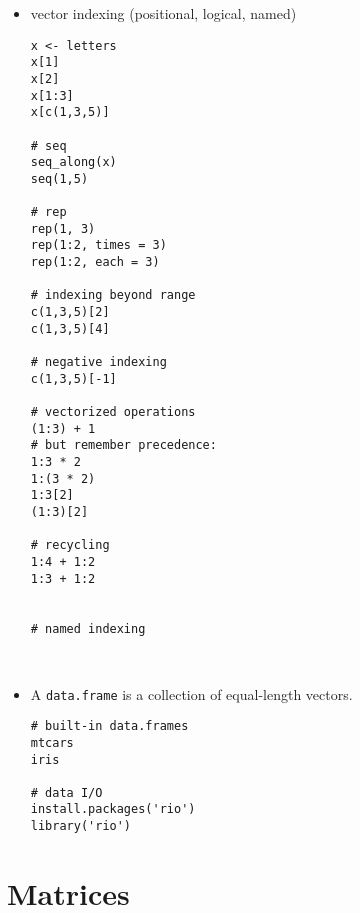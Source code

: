 \documentclass[a4paper,12pt]{article}
\begin{document}
\begin{itemize}
\begin{lstlisting}
TRUE | TRUE
TRUE | FALSE
FALSE | FALSE
TRUE & TRUE
TRUE & FALSE
FALSE & FALSE

!TRUE
!FALSE

TRUE | 1L
FALSE | 1L
TRUE | 0L

TRUE + TRUE
TRUE - FALSE

TRUE - (2*TRUE)


# equality
1 == 1
1 == 1L
TRUE == 1L
2 == 3
2 == TRUE

1 != 1
1 != 0
TRUE != 3

4 %in% 1:5
3:5 %in% c(2,4,6)
!3:5 %in% c(2,4,6)
\end{lstlisting}



\item vector indexing (positional, logical, named)

\begin{lstlisting}
x <- letters
x[1]
x[2]
x[1:3]
x[c(1,3,5)]

# seq
seq_along(x)
seq(1,5)

# rep
rep(1, 3)
rep(1:2, times = 3)
rep(1:2, each = 3)

# indexing beyond range
c(1,3,5)[2]
c(1,3,5)[4]

# negative indexing
c(1,3,5)[-1]

# vectorized operations
(1:3) + 1
# but remember precedence:
1:3 * 2
1:(3 * 2)
1:3[2]
(1:3)[2]

# recycling
1:4 + 1:2
1:3 + 1:2


# named indexing



\end{lstlisting}


\item A \texttt{data.frame} is a collection of equal-length vectors.

\begin{lstlisting}
# built-in data.frames
mtcars
iris

# data I/O
install.packages('rio')
library('rio')

\end{lstlisting}




\end{itemize}



\clearpage
\section{Matrices}
\end{document}

